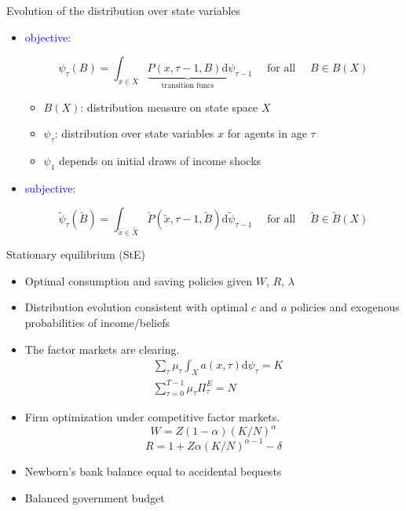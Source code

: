 \documentclass{beamer}
\begin{document}
\begin{frame}{Evolution of the distribution over state variables}
		\begin{itemize}
		\item \textcolor{blue}{objective}: 
		
		\begin{equation*}
			\label{Eq:DistDyn}
			\psi_{\tau}(B)=\int_{x \in X} \underbrace{P(x, \tau-1, B) \mathrm{d}}_{\text{transition funcs}} \psi_{\tau-1} \quad \text { for all } \quad B\in B(X)
		\end{equation*}
	
	\begin{itemize}
		\item $B(X)$:  distribution measure on state space $X$
		\item $\psi_{\tau}$: distribution over state variables $x$ for agents in age $\tau$
		\item $\psi_{1}$ depends on initial draws of income shocks 
	\end{itemize}

		\item \textcolor{blue}{subjective}: 
		
		\begin{equation*}
			\label{Eq:DistDynSub}
			\tilde \psi_{\tau}(\tilde B)=\int_{\tilde x \in \tilde X} \tilde P(\tilde x, \tau-1, \tilde B) \mathrm{d} \tilde \psi_{\tau-1} \quad \text { for all } \quad \tilde B \in \tilde B(X)
		\end{equation*}
	
	\end{itemize}
\end{frame}

\begin{frame}{Stationary equilibrium (StE)}
\begin{itemize}
	\item Optimal consumption and saving policies given $W$, $R$, $\lambda$
	\item Distribution evolution consistent with optimal $c$ and $a$ policies and exogenous probabilities of income/beliefs
	\item The factor markets are clearing. 
	\begin{equation*}
	\begin{split}
		& \sum_{\tau} \mu_{\tau} \int_{X}a(x, \tau) \mathrm{d} \psi_{\tau}=K \\
		& \sum^{T-1}_{\tau=0} \mu_{\tau} \Pi^E_\tau= N
	\end{split}
	\end{equation*}
\item Firm optimization under competitive factor markets.
$$W = Z(1-\alpha) (K/N)^\alpha $$
$$R = 1+Z\alpha (K/N)^{\alpha-1} - \delta$$
\item Newborn's bank balance equal to accidental bequests
\item Balanced government budget 
\end{itemize}
\end{frame}
\end{document}
